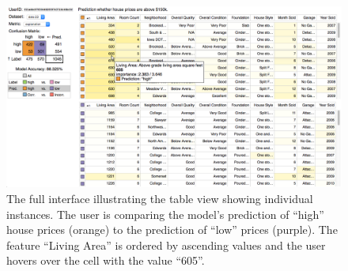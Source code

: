 \begin{figure}
\centering
\includegraphics[width=\linewidth]{aggexplain/full_table_expl}
\caption[The full interface illustrating the table view.]{
The full interface illustrating the table view showing individual instances.
The user is comparing the model's prediction of ``high'' house prices (orange) to the prediction of ``low'' prices (purple).
The feature ``Living Area'' is ordered by ascending values and the user hovers over the cell with the value ``605''.
}
\label{figs:full_view}
\end{figure}
